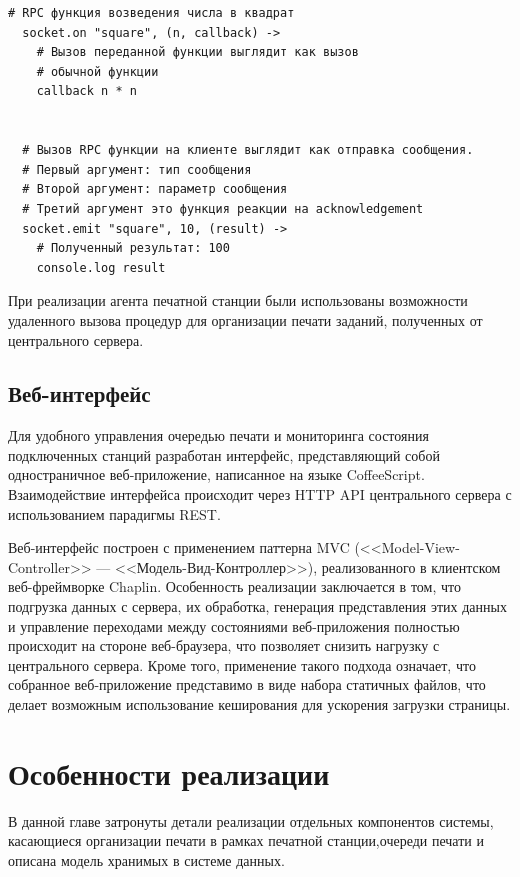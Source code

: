 \documentclass[a4paper,14pt,href,draft]{article}
\begin{document}
\begin{lstlisting}[caption=Удаленный вызов процедур в socket.io, label=lst:rpc]
  # RPC функция возведения числа в квадрат
  socket.on "square", (n, callback) ->
    # Вызов переданной функции выглядит как вызов
    # обычной функции
    callback n * n


  # Вызов RPC функции на клиенте выглядит как отправка сообщения.
  # Первый аргумент: тип сообщения
  # Второй аргумент: параметр сообщения
  # Третий аргумент это функция реакции на acknowledgement
  socket.emit "square", 10, (result) ->
    # Полученный результат: 100
    console.log result
\end{lstlisting}

При реализации агента печатной станции были использованы возможности удаленного вызова процедур для организации печати
заданий, полученных от центрального сервера.

\subsection{Веб-интерфейс}
Для удобного управления очередью печати и мониторинга состояния подключенных станций разработан интерфейс, представляющий
собой одностраничное веб-приложение, написанное на языке CoffeeScript. Взаимодействие интерфейса происходит через HTTP API
центрального сервера с использованием парадигмы REST.

Веб-интерфейс построен с применением паттерна MVC (<<Model-View-Controller>> --- <<Модель-Вид-Контроллер>>)\cite{ScalingIsomorphic},
реализо\-ван\-но\-го в клиентском веб-фреймворке Chaplin\cite{ChaplinJS}. Особенность реализации заключается в том, что
подгрузка данных с сервера, их обработка, генерация представления этих данных и управление переходами между состояниями
веб-приложения полностью происходит на стороне веб-браузера, что позволяет снизить нагрузку с центрального сервера.
Кроме того, применение такого подхода означает, что собранное веб-приложение представимо в виде набора статичных файлов,
что делает возможным использование кеширования для ускорения загрузки страницы.

\newpage
\section{Особенности реализации}
В данной главе затронуты детали реализации отдельных компонентов системы, касающиеся организации печати в рамках
печатной станции,очереди печати и описана модель хранимых в системе данных.
\end{document}
